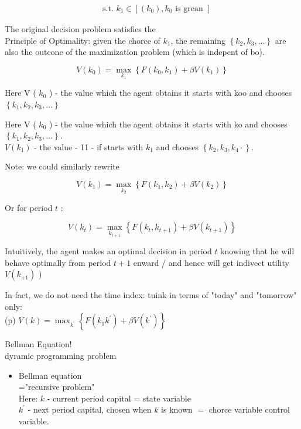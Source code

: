 \documentclass[10pt]{article}
\begin{document}
$$
\begin{aligned}
& \text { s.t. } k_{1} \in\left[\left(k_{0}\right), k_{0} \text { is grean }\right]
\end{aligned}
$$

The original decision problem satisfies the\\
Principle of Optimality: given the chorce of $k_{1}$, the remaining $\left\{k_{2}, k_{3}, \ldots\right\}$ are also the outcone of the maximization problem (which is indepent of bo).

$$
V\left(k_{0}\right)=\max _{k_{1}}\left\{F\left(k_{0}, k_{1}\right)+\beta V\left(k_{1}\right)\right\}
$$

Here V ( $k_{0}$ ) - the value which the agent obtains it starts with koo and chooses $\left\{k_{1}, k_{2}, k_{3}, \ldots\right\}$

Here V ( $k_{0}$ ) - the value which the agent obtains it starts with ko and chooses $\left\{k_{1}, k_{2}, k_{3}, \ldots\right\}$.\\
$V\left(k_{1}\right)$ - the value - 11 - if starts with $k_{1}$ and chooses $\left\{k_{2}, k_{3}, k_{4} \cdot\right\}$.

Note: we could similarly rewrite

$$
V\left(k_{1}\right)=\max _{k_{2}}\left\{F\left(k_{1}, k_{2}\right)+\beta V\left(k_{2}\right)\right\}
$$

Or for period $t$ :

$$
V\left(k_{t}\right)=\max _{k_{t+1}}\left\{F\left(k_{t}, k_{t+1}\right)+\beta V\left(k_{t+1}\right)\right\}
$$

Intuitively, the agent makes an optimal decision in period $t$ knowing that he will behave optimally from period $t+1$ enward / and hence will get indivect utility $V\left(k_{+1}\right)$ )

In fact, we do not need the time index: tuink in terms of "today" and "tomorrow" only:\\
(p) $V(k)=\max _{k^{\prime}}\left\{F\left(k_{1} k^{\prime}\right)+\beta V\left(k^{\prime}\right)\right\}$

Bellman Equation!\\
dyramic programming problem

\begin{itemize}
  \item Bellman equation\\
="recursive problem"\\
Here: $k$ - current period capital = state variable\\
$k^{\prime}$ - next period capital, chosen when $k$ is known $=$ chorce variable control variable.
\end{itemize}
\end{document}
